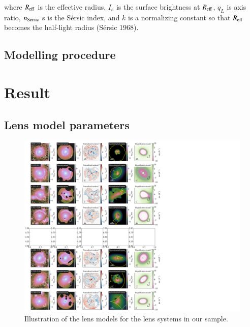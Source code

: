 \documentclass{aa}
\begin{document}
where $R_{\rm eff}$ is the effective radius, $I_e$ is the surface brightness at $R_{\rm eff}$,
$q_L$ is axis ratio, $n_{\rm Sersic}$ s is the Sérsic index, and $k$ is a normalizing constant
so that $R_{\rm eff}$ becomes the half-light radius (Sérsic 1968).

\subsection{Modelling procedure}


\section{Result} \label{sec:result}

\subsection{Lens model parameters}

\begin{figure}
	\centering
	\includegraphics[width=1.55\textwidth]{figures/lens_models.pdf}
	\caption{\label{fig:montage}
	Illustration of the lens models for the lens systems in our sample.
	}
\end{figure}
\end{document}
